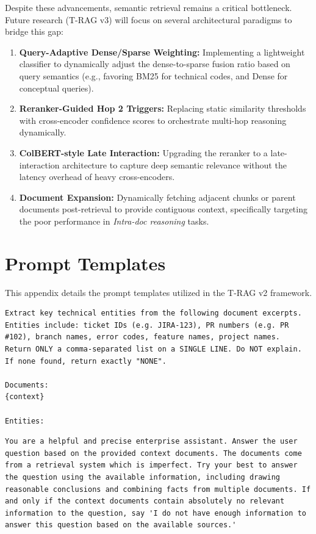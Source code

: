 \documentclass[conference]{IEEEtran}
\begin{document}
Despite these advancements, semantic retrieval remains a critical bottleneck. Future research (T-RAG v3) will focus on several architectural paradigms to bridge this gap:
\begin{enumerate}
    \item \textbf{Query-Adaptive Dense/Sparse Weighting:} Implementing a lightweight classifier to dynamically adjust the dense-to-sparse fusion ratio based on query semantics (e.g., favoring BM25 for technical codes, and Dense for conceptual queries).
    \item \textbf{Reranker-Guided Hop 2 Triggers:} Replacing static similarity thresholds with cross-encoder confidence scores to orchestrate multi-hop reasoning dynamically.
    \item \textbf{ColBERT-style Late Interaction:} Upgrading the reranker to a late-interaction architecture to capture deep semantic relevance without the latency overhead of heavy cross-encoders.
    \item \textbf{Document Expansion:} Dynamically fetching adjacent chunks or parent documents post-retrieval to provide contiguous context, specifically targeting the poor performance in \textit{Intra-doc reasoning} tasks.
\end{enumerate}

\appendix
\section{Prompt Templates}
\label{sec:appendix}
This appendix details the prompt templates utilized in the T-RAG v2 framework.

\begin{lstlisting}[caption=Entity Extraction Prompt, label=lst:entity_prompt]
Extract key technical entities from the following document excerpts.
Entities include: ticket IDs (e.g. JIRA-123), PR numbers (e.g. PR #102), branch names, error codes, feature names, project names.
Return ONLY a comma-separated list on a SINGLE LINE. Do NOT explain. If none found, return exactly "NONE".

Documents:
{context}

Entities:
\end{lstlisting}

\begin{lstlisting}[caption=RAG System Prompt, label=lst:rag_system_prompt]
You are a helpful and precise enterprise assistant. Answer the user question based on the provided context documents. The documents come from a retrieval system which is imperfect. Try your best to answer the question using the available information, including drawing reasonable conclusions and combining facts from multiple documents. If and only if the context documents contain absolutely no relevant information to the question, say 'I do not have enough information to answer this question based on the available sources.'
\end{lstlisting}
\end{document}
